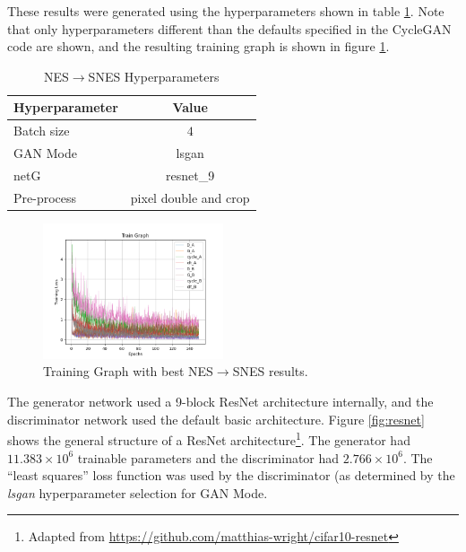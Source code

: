 \documentclass[10pt,twocolumn,letterpaper]{article}
\begin{document}
These results were generated using the hyperparameters shown in table \ref{tab:sneshyperparameters}. Note that only hyperparameters different than the defaults specified in the CycleGAN code are shown, and the resulting training graph is shown in figure \ref{fig:snesgraph}. 

\begin{table}[H]
   \begin{center}
      \begin{tabular}{|l|c|}
         \hline
         \textbf{Hyperparameter} & \textbf{Value} \\
         \hline\hline
         Batch size     & $4$ \\ 
         \hline
                  GAN Mode     & lsgan\\
         \hline
         netG       & resnet\_9  \\ 
         \hline
         Pre-process     & pixel double and crop \\
         \hline
      \end{tabular}
   \end{center}
   \caption{NES$\rightarrow$SNES Hyperparameters}
   \label{tab:sneshyperparameters}
\end{table}

\begin{figure}[H]
   \centering
   \includegraphics[width=0.475\textwidth, height=.3\textwidth]{figures/graphs/train_graph_snes.png}
   \caption{Training Graph with best NES$\rightarrow$SNES results.}
   \label{fig:snesgraph}
\end{figure}

The generator network used a 9-block ResNet architecture internally, and the discriminator network used the default basic architecture. Figure \ref{fig:resnet} shows the general structure of a ResNet architecture\footnote{Adapted from \url{https://github.com/matthias-wright/cifar10-resnet}}. The generator had $11.383 \times 10^6$ trainable parameters and the discriminator had $2.766 \times 10^6$.
The ``least squares'' loss function was used by the discriminator (as determined by the \textit{lsgan} hyperparameter selection for GAN Mode.
\end{document}
